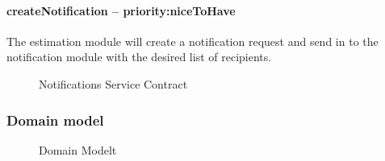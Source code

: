 \paragraph{createNotification -- priority:niceToHave}
The estimation module will create a notification request and send in to the notification module with the desired list of recipients.
	\begin{figure}[H]
	    	\centering
	    	\caption{Notifications Service Contract}
	    	\label{fig:Notification_Service Contract}
   	\end{figure}
\subsubsection{Domain model}
	\begin{figure}[H]
	    	\centering
	    	\caption{Domain Modelt}
	    	\label{fig:Domain Model}
   	\end{figure}
